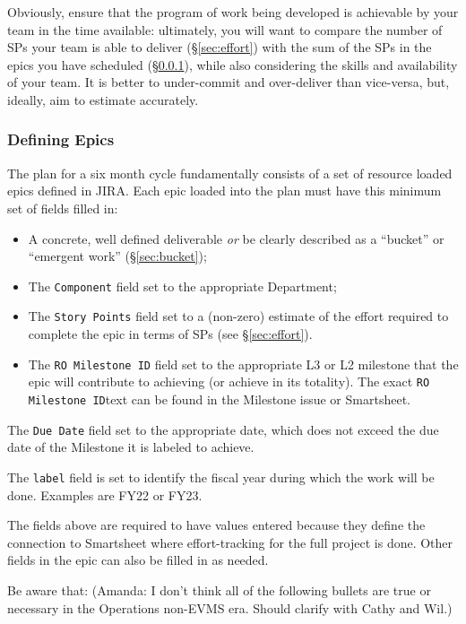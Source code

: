 Obviously, ensure that the program of work being developed is achievable by your team in the time available: ultimately, you will want to compare the number of \glspl{SP} your team is able to deliver (\S\ref{sec:effort}) with the sum of the \glspl{SP} in the \glspl{epic} you have scheduled (\S\ref{sec:planning-epics}), while also considering the skills and availability of your team.
It is better to under-commit and over-deliver than vice-versa, but, ideally, aim to estimate accurately.

\subsubsection{Defining Epics}
\label{sec:planning-epics}

The plan for a six month \gls{cycle} fundamentally consists of a set of resource loaded \glspl{epic} defined in \gls{JIRA}.
Each \gls{epic} loaded into the plan must have this minimum set of fields filled in:

\begin{itemize}
\item
  A concrete, well defined deliverable \emph{or} be clearly described as a ``bucket'' or ``emergent work'' (\S\ref{sec:bucket});
\item
  The \texttt{Component} field set to the appropriate Department;
\item
  The \texttt{Story Points} field set to a (non-zero) estimate of the effort required to complete the \gls{epic} in terms of \glspl{SP} (see \S\ref{sec:effort}).
\item
  The \texttt{RO Milestone ID} field set to the appropriate L3 or L2 milestone that the epic will contribute to achieving (or achieve in its totality).
  The exact \texttt{RO Milestone ID}text can be found in the Milestone issue or Smartsheet.
\end{itemize}
\item
  The \texttt{Due Date} field set to the appropriate date, which does not exceed the due date of the Milestone it is labeled to achieve.
\item
  The \texttt{label} field is set to identify the fiscal year during which the work will be done. Examples are FY22 or FY23.

The fields above are required to have values entered because they define the connection to Smartsheet where effort-tracking for the full project is done. Other fields in the epic can also be filled in as needed. 

Be aware that: (Amanda: I don't think all of the following bullets are true or necessary in the Operations non-EVMS era.  Should clarify with Cathy and Wil.) 

